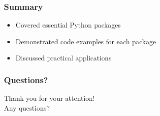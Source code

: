 \documentclass{beamer}
\begin{document}
\begin{frame}
    \frametitle{Summary}
    \begin{itemize}
        \item Covered essential Python packages
        \item Demonstrated code examples for each package
        \item Discussed practical applications
    \end{itemize}
\end{frame}

\begin{frame}
    \frametitle{Questions?}
    \begin{center}
        Thank you for your attention! \\
        Any questions?
    \end{center}
\end{frame}
\end{document}
